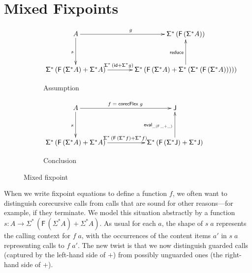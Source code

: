 \documentclass[preprint,draft]
{sigplanconf}
\newcommand\TC{\mathsf}
\newcommand{\ra}{\rightarrow}
\newcommand{\<}{\langle}
\renewcommand{\>}{\rangle}
\newcommand{\reduce}{{{\mathsf{reduce}}}}
\newcommand{\eval}{{{\mathsf{eval}}}}
\newcommand\corecUU{\mathsf{corecFlex}}
\newcommand{\id}{\mathsf{{id}}}
\newcommand{\F}{{\TC{F}}}
\newcommand{\J}{{\TC{J}}}
\renewcommand{\SS}{{\TC{\Sigma}}}
\begin{document}
\section{Mixed Fixpoints}
 \label{sec-mixed}








\begin{figure*}
\centering
        \begin{subfigure}[b]{0.52\textwidth}
\centering
$\xymatrix@C=3pc@R=3pc{
 A
\ar^{g}[r]
\ar_{s}[d]    &  \SS^*\,(\F\,(\SS^*A))
                   \\
\SS^*\,(\F\,(\SS^*A) + \SS^*A)
\ar^{\SS^*\,(\id + \SS^*g)\hspace*{8ex}}[r]  & \SS^*\,(\F\,(\SS^*A) + \SS^*\,(\SS^*\,(\F\,(\SS^*A)))))  \ar^{\reduce}[u]
}$
                \caption{Assumption}
                \label{fig-mixed-asm}
        \end{subfigure}\enskip\quad
\vspace*{1ex}
\hspace*{1ex}
                \begin{subfigure}[b]{0.43\textwidth}
$\xymatrix@C=4.5pc@R=3pc{
 A
\ar^{f \;=\; \corecUU\;g}[r]
\ar_{s}[d]    &  \J
                   \\
\SS^*\,(\F\,(\SS^*A) + \SS^*A)
\ar^{\SS^*\,(\F\,(\SS^*f) + \SS^*f)}[r]  &  \SS^*\,(\F\,(\SS^*\J) + \SS^*\J) \ar^{\eval_{\_(\F\,\_ + \_)}}[u]
}$
                \caption{Conclusion}
                \label{fig-mixed-concl}
        \end{subfigure}\vspace*{-2ex}
\caption{Mixed fixpoint}
\label{fig-mixed}
\end{figure*}



When we write fixpoint equations to define a function $f$, we often want to
distinguish corecursive calls from calls that are sound for other reasons---for
example, if they terminate.
We model this situation abstractly
by a function $s : A \ra \SS^*\,(\F\,(\SS^*A) + \SS^*A)$. As usual for each $a$,
the shape of $s\;a$ represents the calling context for $f\;a$, with the occurrences of
the content items $a'$ in $s\;a$ representing calls to $f\;a'$. The new twist is that we now distinguish
guarded calls (captured by the left-hand side of $+$) from possibly unguarded ones
(the right-hand side of $+$).
\end{document}

